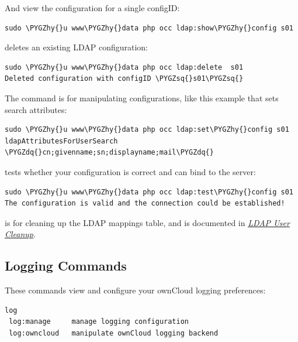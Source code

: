 \documentclass[letterpaper,10pt,english]{sphinxmanual}
\def\PYGZhy{\char`\-}
\def\PYGZsq{\char`\'}
\def\PYGZdq{\char`\"}
\renewcommand\PYGZsq{\textquotesingle}
\begin{document}
And view the configuration for a single configID:

\begin{Verbatim}[commandchars=\\\{\}]
sudo \PYGZhy{}u www\PYGZhy{}data php occ ldap:show\PYGZhy{}config s01
\end{Verbatim}

 deletes an existing LDAP configuration:

\begin{Verbatim}[commandchars=\\\{\}]
sudo \PYGZhy{}u www\PYGZhy{}data php occ ldap:delete  s01
Deleted configuration with configID \PYGZsq{}s01\PYGZsq{}
\end{Verbatim}

The  command is for manipulating configurations, like this
example that sets search attributes:

\begin{Verbatim}[commandchars=\\\{\}]
sudo \PYGZhy{}u www\PYGZhy{}data php occ ldap:set\PYGZhy{}config s01 ldapAttributesForUserSearch
\PYGZdq{}cn;givenname;sn;displayname;mail\PYGZdq{}
\end{Verbatim}

 tests whether your configuration is correct and can bind to
the server:

\begin{Verbatim}[commandchars=\\\{\}]
sudo \PYGZhy{}u www\PYGZhy{}data php occ ldap:test\PYGZhy{}config s01
The configuration is valid and the connection could be established!
\end{Verbatim}

 is for cleaning up the LDAP mappings table, and is
documented in {\hyperref[configuration_user/user_auth_ldap_cleanup::doc]{\emph{\emph{LDAP User Cleanup}}}}.


\subsection{Logging Commands}
\label{configuration_server/occ_command:logging-commands-label}\label{configuration_server/occ_command:logging-commands}
These commands view and configure your ownCloud logging preferences:

\begin{Verbatim}[commandchars=\\\{\}]
log
 log:manage     manage logging configuration
 log:owncloud   manipulate ownCloud logging backend
\end{Verbatim}
\end{document}
